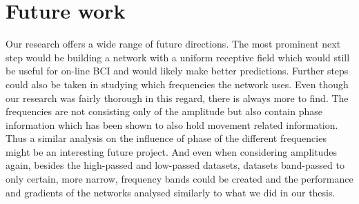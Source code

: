\section*{Future work}
Our research offers a wide range of future directions.
The most prominent next step would be building a network with a uniform receptive field which would still be useful for on-line BCI and would likely make better predictions.
Further steps could also be taken in studying which frequencies the network uses.
Even though our research was fairly thorough in this regard, there is always more to find.
The frequencies are not consisting only of the amplitude but also contain phase information which has been shown to also hold movement related information. 
Thus a similar analysis on the influence of phase of the different frequencies might be an interesting future project.
And even when considering amplitudes again, besides the high-passed and low-passed datasets, datasets band-passed to only certain, more narrow, frequency bands could be created and the performance and gradients of the networks analysed similarly to what we did in our thesis.



